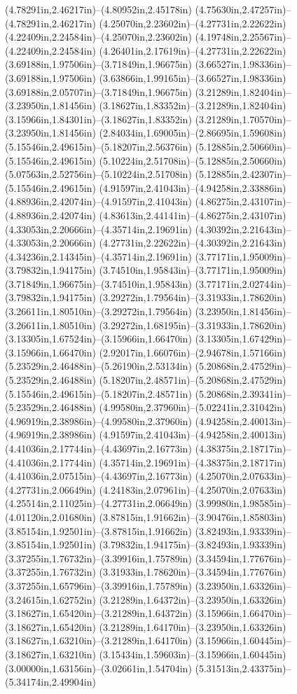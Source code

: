 (4.78291in,2.46217in)--(4.80952in,2.45178in) (4.75630in,2.47257in)--(4.78291in,2.46217in) (4.25070in,2.23602in)--(4.27731in,2.22622in) (4.22409in,2.24584in)--(4.25070in,2.23602in) (4.19748in,2.25567in)--(4.22409in,2.24584in) (4.26401in,2.17619in)--(4.27731in,2.22622in) (3.69188in,1.97506in)--(3.71849in,1.96675in) (3.66527in,1.98336in)--(3.69188in,1.97506in) (3.63866in,1.99165in)--(3.66527in,1.98336in) (3.69188in,2.05707in)--(3.71849in,1.96675in) (3.21289in,1.82404in)--(3.23950in,1.81456in) (3.18627in,1.83352in)--(3.21289in,1.82404in) (3.15966in,1.84301in)--(3.18627in,1.83352in) (3.21289in,1.70570in)--(3.23950in,1.81456in) (2.84034in,1.69005in)--(2.86695in,1.59608in) (5.15546in,2.49615in)--(5.18207in,2.56376in) (5.12885in,2.50660in)--(5.15546in,2.49615in) (5.10224in,2.51708in)--(5.12885in,2.50660in) (5.07563in,2.52756in)--(5.10224in,2.51708in) (5.12885in,2.42307in)--(5.15546in,2.49615in) (4.91597in,2.41043in)--(4.94258in,2.33886in) (4.88936in,2.42074in)--(4.91597in,2.41043in) (4.86275in,2.43107in)--(4.88936in,2.42074in) (4.83613in,2.44141in)--(4.86275in,2.43107in) (4.33053in,2.20666in)--(4.35714in,2.19691in) (4.30392in,2.21643in)--(4.33053in,2.20666in) (4.27731in,2.22622in)--(4.30392in,2.21643in) (4.34236in,2.14345in)--(4.35714in,2.19691in) (3.77171in,1.95009in)--(3.79832in,1.94175in) (3.74510in,1.95843in)--(3.77171in,1.95009in) (3.71849in,1.96675in)--(3.74510in,1.95843in) (3.77171in,2.02744in)--(3.79832in,1.94175in) (3.29272in,1.79564in)--(3.31933in,1.78620in) (3.26611in,1.80510in)--(3.29272in,1.79564in) (3.23950in,1.81456in)--(3.26611in,1.80510in) (3.29272in,1.68195in)--(3.31933in,1.78620in) (3.13305in,1.67524in)--(3.15966in,1.66470in) (3.13305in,1.67429in)--(3.15966in,1.66470in) (2.92017in,1.66076in)--(2.94678in,1.57166in) (5.23529in,2.46488in)--(5.26190in,2.53134in) (5.20868in,2.47529in)--(5.23529in,2.46488in) (5.18207in,2.48571in)--(5.20868in,2.47529in) (5.15546in,2.49615in)--(5.18207in,2.48571in) (5.20868in,2.39341in)--(5.23529in,2.46488in) (4.99580in,2.37960in)--(5.02241in,2.31042in) (4.96919in,2.38986in)--(4.99580in,2.37960in) (4.94258in,2.40013in)--(4.96919in,2.38986in) (4.91597in,2.41043in)--(4.94258in,2.40013in) (4.41036in,2.17744in)--(4.43697in,2.16773in) (4.38375in,2.18717in)--(4.41036in,2.17744in) (4.35714in,2.19691in)--(4.38375in,2.18717in) (4.41036in,2.07515in)--(4.43697in,2.16773in) (4.25070in,2.07633in)--(4.27731in,2.06649in) (4.24183in,2.07961in)--(4.25070in,2.07633in) (4.25514in,2.11025in)--(4.27731in,2.06649in) (3.99980in,1.98585in)--(4.01120in,2.01680in) (3.87815in,1.91662in)--(3.90476in,1.85803in) (3.85154in,1.92501in)--(3.87815in,1.91662in) (3.82493in,1.93339in)--(3.85154in,1.92501in) (3.79832in,1.94175in)--(3.82493in,1.93339in) (3.37255in,1.76732in)--(3.39916in,1.75789in) (3.34594in,1.77676in)--(3.37255in,1.76732in) (3.31933in,1.78620in)--(3.34594in,1.77676in) (3.37255in,1.65796in)--(3.39916in,1.75789in) (3.23950in,1.63326in)--(3.24615in,1.62752in) (3.21289in,1.64372in)--(3.23950in,1.63326in) (3.18627in,1.65420in)--(3.21289in,1.64372in) (3.15966in,1.66470in)--(3.18627in,1.65420in) (3.21289in,1.64170in)--(3.23950in,1.63326in) (3.18627in,1.63210in)--(3.21289in,1.64170in) (3.15966in,1.60445in)--(3.18627in,1.63210in) (3.15434in,1.59603in)--(3.15966in,1.60445in) (3.00000in,1.63156in)--(3.02661in,1.54704in) (5.31513in,2.43375in)--(5.34174in,2.49904in) 
